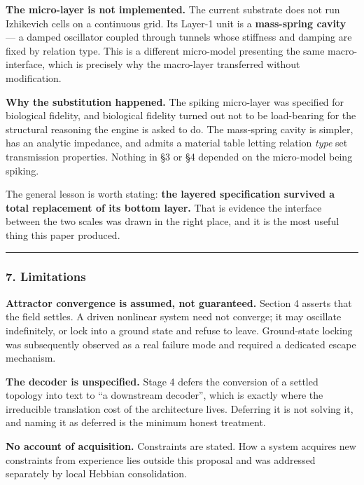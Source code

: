 \documentclass[
  11pt,
  a4paper,
]{article}
\begin{document}
\textbf{The micro-layer is not implemented.} The current substrate does
not run Izhikevich cells on a continuous grid. Its Layer-1 unit is a
\textbf{mass-spring cavity} --- a damped oscillator coupled through
tunnels whose stiffness and damping are fixed by relation type. This is
a different micro-model presenting the same macro-interface, which is
precisely why the macro-layer transferred without modification.

\textbf{Why the substitution happened.} The spiking micro-layer was
specified for biological fidelity, and biological fidelity turned out
not to be load-bearing for the structural reasoning the engine is asked
to do. The mass-spring cavity is simpler, has an analytic impedance, and
admits a material table letting relation \emph{type} set transmission
properties. Nothing in §3 or §4 depended on the micro-model being
spiking.

The general lesson is worth stating: \textbf{the layered specification
survived a total replacement of its bottom layer.} That is evidence the
interface between the two scales was drawn in the right place, and it is
the most useful thing this paper produced.

\begin{center}\rule{0.5\linewidth}{0.5pt}\end{center}

\subsubsection{7. Limitations}\label{limitations-2}

\textbf{Attractor convergence is assumed, not guaranteed.} Section 4
asserts that the field settles. A driven nonlinear system need not
converge; it may oscillate indefinitely, or lock into a ground state and
refuse to leave. Ground-state locking was subsequently observed as a
real failure mode and required a dedicated escape mechanism.

\textbf{The decoder is unspecified.} Stage 4 defers the conversion of a
settled topology into text to ``a downstream decoder'', which is exactly
where the irreducible translation cost of the architecture lives.
Deferring it is not solving it, and naming it as deferred is the minimum
honest treatment.

\textbf{No account of acquisition.} Constraints are stated. How a system
acquires new constraints from experience lies outside this proposal and
was addressed separately by local Hebbian consolidation.
\end{document}
